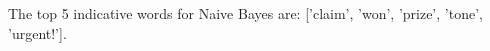 \begin{answer}
The top 5 indicative words for Naive Bayes are:  ['claim', 'won', 'prize', 'tone', 'urgent!'].
\end{answer}
